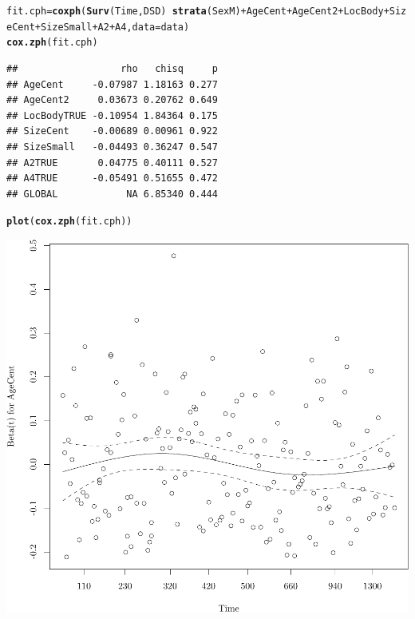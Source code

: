 \documentclass{article}\usepackage[]{graphicx}\usepackage[]{color}
\makeatletter
\def\maxwidth{ %
  \ifdim\Gin@nat@width>\linewidth
    \linewidth
  \else
    \Gin@nat@width
  \fi
}
\newcommand{\hlopt}[1]{\textcolor[rgb]{0,0,0}{#1}}%
\newcommand{\hlstd}[1]{\textcolor[rgb]{0.345,0.345,0.345}{#1}}%
\newcommand{\hlkwb}[1]{\textcolor[rgb]{0.69,0.353,0.396}{#1}}%
\newcommand{\hlkwc}[1]{\textcolor[rgb]{0.333,0.667,0.333}{#1}}%
\newcommand{\hlkwd}[1]{\textcolor[rgb]{0.737,0.353,0.396}{\textbf{#1}}}%
\newenvironment{kframe}{%
 \def\at@end@of@kframe{}%
 \ifinner\ifhmode%
  \def\at@end@of@kframe{\end{minipage}}%
  \begin{minipage}{\columnwidth}%
 \fi\fi%
 \def\FrameCommand##1{\hskip\@totalleftmargin \hskip-\fboxsep
 \colorbox{shadecolor}{##1}\hskip-\fboxsep
     \hskip-\linewidth \hskip-\@totalleftmargin \hskip\columnwidth}%
 \MakeFramed {\advance\hsize-\width
   \@totalleftmargin\z@ \linewidth\hsize
   \@setminipage}}%
 {\par\unskip\endMakeFramed%
 \at@end@of@kframe}
\newenvironment{knitrout}{}{} %
\makeatother
\begin{document}
\begin{knitrout}
\color{fgcolor}\begin{kframe}
\begin{alltt}
\hlstd{fit.cph} \hlkwb{=} \hlkwd{coxph}\hlstd{(}\hlkwd{Surv}\hlstd{(Time, DSD)} \hlopt{~} \hlkwd{strata}\hlstd{(SexM)} \hlopt{+} \hlstd{AgeCent} \hlopt{+} \hlstd{AgeCent2} \hlopt{+} \hlstd{LocBody} \hlopt{+} \hlstd{SizeCent} \hlopt{+} \hlstd{SizeSmall} \hlopt{+} \hlstd{A2} \hlopt{+} \hlstd{A4,} \hlkwc{data} \hlstd{= data)}
\hlkwd{cox.zph}\hlstd{(fit.cph)}
\end{alltt}
\begin{verbatim}
##                  rho   chisq     p
## AgeCent     -0.07987 1.18163 0.277
## AgeCent2     0.03673 0.20762 0.649
## LocBodyTRUE -0.10954 1.84364 0.175
## SizeCent    -0.00689 0.00961 0.922
## SizeSmall   -0.04493 0.36247 0.547
## A2TRUE       0.04775 0.40111 0.527
## A4TRUE      -0.05491 0.51655 0.472
## GLOBAL            NA 6.85340 0.444
\end{verbatim}
\begin{alltt}
\hlkwd{plot}\hlstd{(}\hlkwd{cox.zph}\hlstd{(fit.cph))}
\end{alltt}
\end{kframe}

{\centering \includegraphics[width=\maxwidth]{figure/05-eda-ph-check-full-3-1} 

}
\end{knitrout}
\end{document}
